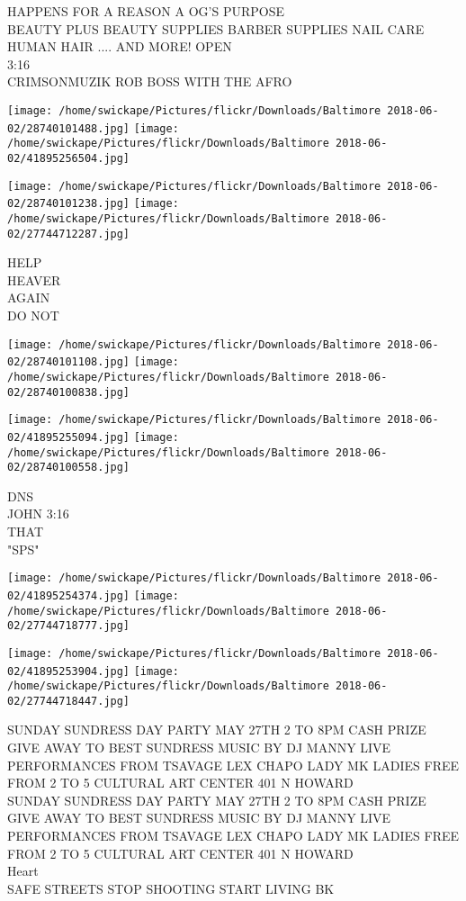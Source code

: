 \documentclass[10pt,letterpaper]{article}
\begin{document}
HAPPENS FOR A REASON A OG'S PURPOSE\\
BEAUTY PLUS BEAUTY SUPPLIES BARBER SUPPLIES NAIL CARE HUMAN HAIR .... AND MORE!  OPEN\\
3:16\\
CRIMSONMUZIK ROB BOSS WITH THE AFRO
\pagebreak

\texttt{[image: /home/swickape/Pictures/flickr/Downloads/Baltimore 2018-06-02/28740101488.jpg]}
\texttt{[image: /home/swickape/Pictures/flickr/Downloads/Baltimore 2018-06-02/41895256504.jpg]}

\texttt{[image: /home/swickape/Pictures/flickr/Downloads/Baltimore 2018-06-02/28740101238.jpg]}
\texttt{[image: /home/swickape/Pictures/flickr/Downloads/Baltimore 2018-06-02/27744712287.jpg]}

HELP\\
HEAVER\\
AGAIN\\
DO NOT
\pagebreak

\texttt{[image: /home/swickape/Pictures/flickr/Downloads/Baltimore 2018-06-02/28740101108.jpg]}
\texttt{[image: /home/swickape/Pictures/flickr/Downloads/Baltimore 2018-06-02/28740100838.jpg]}

\texttt{[image: /home/swickape/Pictures/flickr/Downloads/Baltimore 2018-06-02/41895255094.jpg]}
\texttt{[image: /home/swickape/Pictures/flickr/Downloads/Baltimore 2018-06-02/28740100558.jpg]}

DNS\\
JOHN 3:16\\
THAT\\
"SPS"
\pagebreak

\texttt{[image: /home/swickape/Pictures/flickr/Downloads/Baltimore 2018-06-02/41895254374.jpg]}
\texttt{[image: /home/swickape/Pictures/flickr/Downloads/Baltimore 2018-06-02/27744718777.jpg]}

\texttt{[image: /home/swickape/Pictures/flickr/Downloads/Baltimore 2018-06-02/41895253904.jpg]}
\texttt{[image: /home/swickape/Pictures/flickr/Downloads/Baltimore 2018-06-02/27744718447.jpg]}

SUNDAY SUNDRESS DAY PARTY MAY 27TH 2 TO 8PM CASH PRIZE GIVE AWAY TO BEST SUNDRESS MUSIC BY DJ MANNY LIVE PERFORMANCES FROM TSAVAGE LEX CHAPO LADY MK LADIES FREE FROM 2 TO 5 CULTURAL ART CENTER 401 N HOWARD\\
SUNDAY SUNDRESS DAY PARTY MAY 27TH 2 TO 8PM CASH PRIZE GIVE AWAY TO BEST SUNDRESS MUSIC BY DJ MANNY LIVE PERFORMANCES FROM TSAVAGE LEX CHAPO LADY MK LADIES FREE FROM 2 TO 5 CULTURAL ART CENTER 401 N HOWARD\\
Heart\\
SAFE STREETS STOP SHOOTING START LIVING BK
\pagebreak
\end{document}
